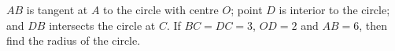 $AB$ is tangent at $A$ to the circle with centre $O$; point $D$ is interior to the circle; and $DB$ intersects the circle at $C$. If $BC=DC=3$, $OD=2$ and $AB=6$, then find the radius of the circle.
